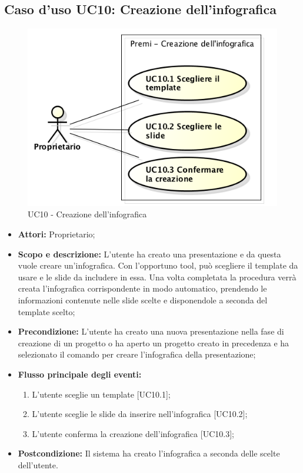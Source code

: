 \subsection{Caso d'uso UC10: Creazione dell'infografica}
\begin{figure}[h] 
	\centering 
	\includegraphics[scale=0.45] {img/UC10.png}
	\caption{UC10 - Creazione dell'\gls{infografica}}
\end{figure}

\begin{itemize}
	\item \textbf{Attori:} Proprietario;
	\item \textbf{Scopo e descrizione:} L'utente ha creato una presentazione e da questa vuole creare un'\gls{infografica}. Con l'opportuno tool, può scegliere il \gls{template} da usare e le \gls{slide} da includere in essa. Una volta completata la procedura verrà creata l'\gls{infografica} corrispondente in modo automatico, prendendo le informazioni contenute nelle slide scelte e disponendole a seconda del template scelto;
	\item \textbf{Precondizione:} L'utente ha creato una nuova presentazione nella fase di creazione di un progetto o ha aperto un progetto creato in precedenza e ha selezionato il comando per creare l'\gls{infografica} della presentazione;
	
	\item \textbf{Flusso principale degli eventi:}
	\begin{enumerate}
		\item L'utente sceglie un \gls{template} [UC10.1];
		\item L'utente sceglie le \gls{slide} da inserire nell'\gls{infografica} [UC10.2];
		\item L'utente conferma la creazione dell'\gls{infografica} [UC10.3];
	\end{enumerate}
	\item \textbf{Postcondizione:} Il sistema ha creato l'\gls{infografica} a seconda delle scelte dell'utente.
\end{itemize}



